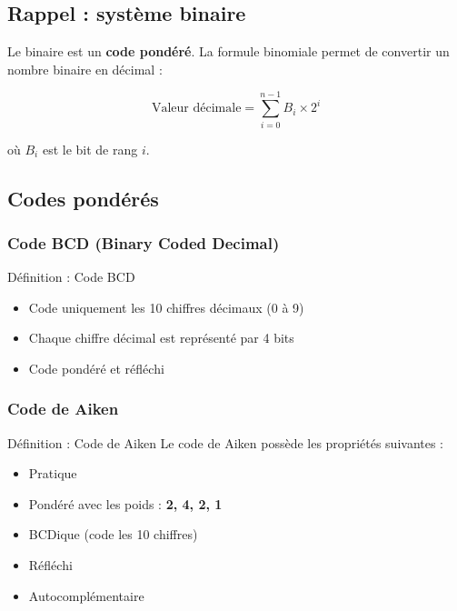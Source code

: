 \documentclass[a4paper,12pt]{article}
\begin{document}
\subsection{Rappel : système binaire}

Le binaire est un \textbf{code pondéré}. La formule binomiale permet de convertir un nombre binaire en décimal :

\[
\text{Valeur décimale} = \sum_{i=0}^{n-1} B_i \times 2^i
\]

où $B_i$ est le bit de rang $i$.

\subsection{Codes pondérés}

\subsubsection{Code BCD (Binary Coded Decimal)}

\begin{defbox}{Définition : Code BCD}
\begin{itemize}
    \item Code uniquement les 10 chiffres décimaux (0 à 9)
    \item Chaque chiffre décimal est représenté par 4 bits
    \item Code pondéré et réfléchi
\end{itemize}
\end{defbox}

\subsubsection{Code de Aiken}

\begin{defbox}{Définition : Code de Aiken}
Le code de Aiken possède les propriétés suivantes :

\begin{itemize}
    \item Pratique
    \item Pondéré avec les poids : \textbf{2, 4, 2, 1}
    \item BCDique (code les 10 chiffres)
    \item Réfléchi
    \item Autocomplémentaire
\end{itemize}
\end{defbox}
\end{document}

